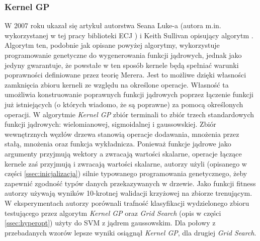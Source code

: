 \subsubsection{Kernel GP}
W 2007 roku ukazał się artykuł autorstwa Seana Luke-a (autora m.in. wykorzystanej w tej pracy biblioteki ECJ \cite{sean_ecj_2010}) i Keith Sullivan opisujący algorytm  \cite{sullivan_evolving_2007}. Algorytm ten, podobnie jak opisane powyżej algorytmy, wykorzystuje programowanie genetyczne do wygenerowania funkcji jądrowych, jednak jako jedyny gwarantuje, że powstałe w ten sposób kernele będą spełniać warunki poprawności definiowane przez teorię Merera. Jest to możliwe dzięki własności zamknięcia zbioru kerneli ze względu na określone operacje. Własność ta umożliwia konstruowanie poprawnych funkcji jądrowych poprzez łączenie funkcji już istniejących (o których wiadomo, że są poprawne) za pomocą określonych operacji. W algorytmie \emph{Kernel GP} zbiór terminali to zbiór trzech standardowych funkcji jądrowych: wielomianowej, sigmoidalnej i gaussowskiej. Zbiór wewnętrznych węzłów drzewa stanowią operacje dodawania, mnożenia przez stałą, mnożenia oraz funkcja wykładnicza. Ponieważ funkcje jądrowe jako argumenty przyjmują wektory a zwracają wartości skalarne, operacje łączące kernele zaś przyjmują i zwracają wartości skalarne, autorzy użyli (opisanego w części \ref{ssec:inicjalizacja}) silnie typowanego programowania genetycznego, żeby zapewnić zgodność typów danych przekazywanych w drzewie.
Jako funkcji fitness autorzy używają wyników 10-krotnej walidacji krzyżowej na zbiorze trenującym.
W eksperymentach autorzy porównali trafność klasyfikacji wydzielonego zbioru testującego przez algorytm \emph{Kernel GP} oraz \emph{Grid Search} (opis w części \ref{ssec:hyperopt}) użyty do SVM z jądrem gaussowskim. Dla połowy z przebadanych wzorów lepsze wyniki osiągnął \emph{Kernel GP}, dla drugiej \emph{Grid Search}.


\clearpage
